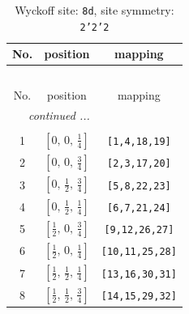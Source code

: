 \documentclass[fleqn,8pt]{jsarticle}
\begin{document}
\begin{longtable}{ccc}
\caption{Wyckoff site: {\tt 8d}, site symmetry: {\tt 2'2'2}}
 \\
 \hline \hline
No. & position & mapping \\ \hline \endfirsthead

\multicolumn{2}{l}{\tablename\ \thetable{}} \\
 \hline \hline
No. & position & mapping \\ \hline \endhead

 \hline \hline
\multicolumn{2}{r}{\footnotesize\it continued ...} \\ \endfoot

 \hline \hline
\multicolumn{2}{r}{} \\ \endlastfoot

1 & $\left[ 0,\, 0,\, \frac{1}{4} \right]$ & {\tt [1,4,18,19]} \\ \hline
2 & $\left[ 0,\, 0,\, \frac{3}{4} \right]$ & {\tt [2,3,17,20]} \\ \hline
3 & $\left[ 0,\, \frac{1}{2},\, \frac{3}{4} \right]$ & {\tt [5,8,22,23]} \\ \hline
4 & $\left[ 0,\, \frac{1}{2},\, \frac{1}{4} \right]$ & {\tt [6,7,21,24]} \\ \hline
5 & $\left[ \frac{1}{2},\, 0,\, \frac{3}{4} \right]$ & {\tt [9,12,26,27]} \\ \hline
6 & $\left[ \frac{1}{2},\, 0,\, \frac{1}{4} \right]$ & {\tt [10,11,25,28]} \\ \hline
7 & $\left[ \frac{1}{2},\, \frac{1}{2},\, \frac{1}{4} \right]$ & {\tt [13,16,30,31]} \\ \hline
8 & $\left[ \frac{1}{2},\, \frac{1}{2},\, \frac{3}{4} \right]$ & {\tt [14,15,29,32]} \\
\end{longtable}
\renewcommand{\arraystretch}{1.2}
\end{document}
